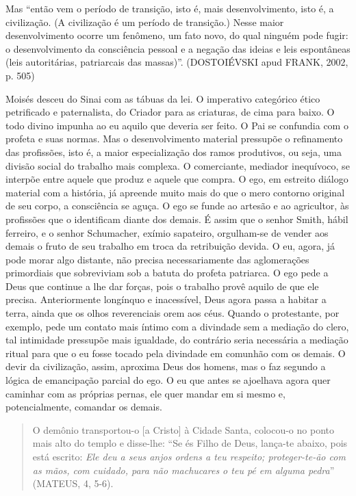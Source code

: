 Mas ``então vem o período de transição, isto é, mais desenvolvimento,
isto é, a civilização. (A civilização é um período de transição.) Nesse
maior desenvolvimento ocorre um fenômeno, um fato novo, do qual ninguém
pode fugir: o desenvolvimento da consciência pessoal e a negação das
ideias e leis espontâneas (leis autoritárias, patriarcais das massas)''.
(DOSTOIÉVSKI apud FRANK, 2002, p. 505)

Moisés desceu do Sinai com as tábuas da lei. O imperativo categórico
ético petrificado e paternalista, do Criador para as criaturas, de cima
para baixo. O todo divino impunha ao eu aquilo que deveria ser feito. O
Pai se confundia com o profeta e suas normas. Mas o desenvolvimento
material pressupõe o refinamento das profissões, isto é, a maior
especialização dos ramos produtivos, ou seja, uma divisão social do
trabalho mais complexa. O comerciante, mediador inequívoco, se interpõe
entre aquele que produz e aquele que compra. O ego, em estreito diálogo
material com a história, já apreende muito mais do que o mero contorno
original de seu corpo, a consciência se aguça. O ego se funde ao artesão
e ao agricultor, às profissões que o identificam diante dos demais. É
assim que o senhor Smith, hábil ferreiro, e o senhor Schumacher, exímio
sapateiro, orgulham-se de vender aos demais o fruto de seu trabalho em
troca da retribuição devida. O eu, agora, já pode morar algo distante,
não precisa necessariamente das aglomerações primordiais que sobreviviam
sob a batuta do profeta patriarca. O ego pede a Deus que continue a lhe
dar forças, pois o trabalho provê aquilo de que ele precisa.
Anteriormente longínquo e inacessível, Deus agora passa a habitar a
terra, ainda que os olhos reverenciais orem aos céus. Quando o
protestante, por exemplo, pede um contato mais íntimo com a divindade
sem a mediação do clero, tal intimidade pressupõe mais igualdade, do
contrário seria necessária a mediação ritual para que o eu fosse tocado
pela divindade em comunhão com os demais. O devir da civilização, assim,
aproxima Deus dos homens, mas o faz segundo a lógica de emancipação
parcial do ego. O eu que antes se ajoelhava agora quer caminhar com as
próprias pernas, ele quer mandar em si mesmo e, potencialmente, comandar
os demais.

\begin{quote}
O demônio transportou-o {[}a Cristo{]} à Cidade Santa, colocou-o no
ponto mais alto do templo e disse-lhe: ``Se és Filho de Deus, lança-te
abaixo, pois está escrito: \emph{Ele deu a seus anjos ordens a teu
respeito; proteger-te-ão com as mãos, com cuidado, para não machucares o
teu pé em alguma pedra}'' (MATEUS, 4, 5-6).
\end{quote}

